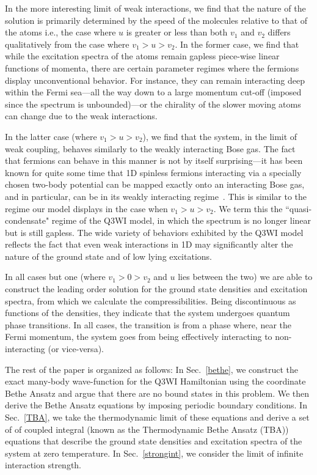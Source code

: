 \documentclass[aps,pra,
superscriptaddress,
reprint,twocolumn,preprintnumbers,
amsmath,amssymb,
nofootinbib]{revtex4-1}
\begin{document}
In the more interesting limit of weak interactions, we find that the nature of the solution is primarily determined by the speed of the molecules relative to that of the atoms i.e., the case where $u$ is greater or less than both $v_1$ and $v_2$ differs qualitatively from the case where $v_1>u>v_2$. In the former case, we find that while the excitation spectra of the atoms remain gapless piece-wise linear functions of momenta, there are certain parameter regimes where the fermions display unconventional behavior. For instance, they can remain interacting deep within the Fermi sea---all the way down to a large momentum cut-off (imposed since the spectrum is unbounded)---or the chirality of the slower moving atoms can change due to the weak interactions.

In the latter case (where $v_1>u>v_2$), we find that the system, in the limit of weak coupling, behaves similarly to the weakly interacting Bose gas. The fact that fermions can behave in this manner is not by itself surprising---it has been known for quite some time that 1D spinless
fermions interacting via a specially chosen two-body potential can be mapped exactly onto an interacting Bose gas, and in particular, can be in its weakly interacting regime~\cite{Shigehara1999, Girardeau2005, Glazman2007}. This is similar to the regime our model displays in the case when $v_1>u>v_2$. We term this the ``quasi-condensate" regime of the Q3WI model, in which the spectrum is no longer
linear but is still gapless. 
The wide variety of behaviors exhibited by the Q3WI model reflects the fact that even weak interactions in 1D may significantly alter the nature of the ground state and of low lying excitations.

In all cases but one (where $v_1 > 0 > v_2$ and $u$ lies between the two) we are able to construct the leading order solution for the ground state densities and excitation spectra, from which we calculate the compressibilities. Being discontinuous as functions of the densities, they indicate that the system undergoes quantum phase transitions. In all cases, the transition is from a phase where, near the Fermi momentum, the system goes from being effectively interacting to non-interacting (or vice-versa).

The rest of the paper is organized as follows: In Sec.~\ref{bethe}, we construct the exact many-body wave-function for the Q3WI Hamiltonian using the coordinate Bethe Ansatz and argue that there are no bound states in this problem. We then derive the Bethe Ansatz equations by imposing periodic boundary conditions. In Sec.~\ref{TBA}, we take the thermodynamic limit of these equations and derive a set of of coupled integral (known as the Thermodynamic Bethe Ansatz (TBA)) equations that describe the ground state densities and excitation spectra of the system at zero temperature. In Sec.~\ref{strongint}, we consider the limit of infinite interaction strength.
\end{document}
